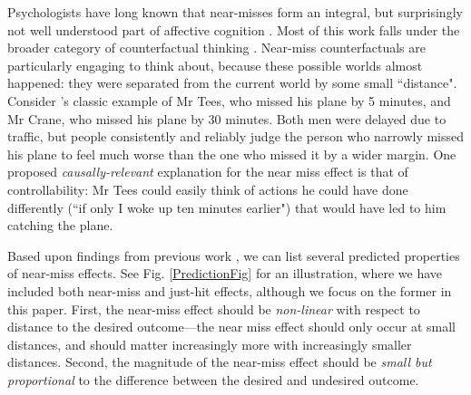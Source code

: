 \documentclass[10pt,letterpaper]{article}
\begin{document}
	Psychologists have long known that near-misses form an integral, but surprisingly not well understood part of affective cognition \cite{Johnson1986, Gleicher1990}. Most of this work falls under the broader category of counterfactual thinking \cite{Bryne2002,McMullen2002, Medvec1997, Roese1997}. Near-miss counterfactuals are particularly engaging to think about, because these possible worlds almost happened: they were separated from the current world by some small ``distance". Consider 's classic example of Mr Tees, who missed his plane by 5 minutes, and Mr Crane, who missed his plane by 30 minutes. Both men were delayed due to traffic, but people consistently and reliably judge the person who narrowly missed his plane to feel much worse than the one who missed it by a wider margin. One proposed \textit{causally-relevant} explanation for the near miss effect is that of controllability: Mr Tees could easily think of actions he could have done differently (``if only I woke up ten minutes earlier") that would have led to him catching the plane. 


	Based upon findings from previous work \cite{Kahneman1982, Johnson1986, Gleicher1990}, we can list several predicted properties of near-miss effects. See Fig. \ref{PredictionFig} for an illustration, where we have included both near-miss and just-hit effects, although we focus on the former in this paper. First, the near-miss effect should be \textit{non-linear} with respect to distance to the desired outcome---the near miss effect should only occur at small distances, and should matter increasingly more with increasingly smaller distances. Second, the magnitude of the near-miss effect should be \textit{small but proportional} to the difference between the desired and undesired outcome.
\end{document}
